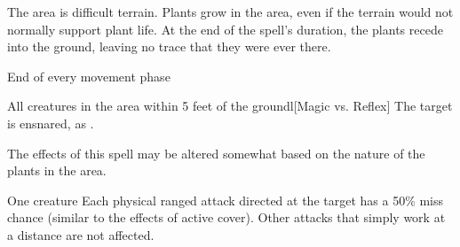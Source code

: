 \begin{spellheader}
    \spelldur{\durshort \dismissable}
\end{spellheader}
\begin{spelleffects}
    \spelleffect The area is difficult terrain. Plants grow in the area, even if the terrain would not normally support plant life. At the end of the spell's duration, the plants recede into the ground, leaving no trace that they were ever there.
    \begin{spelltrigger}{End of every movement phase}
        \begin{spelltarget}{All creatures in the area within 5 feet of the ground}l[Magic vs. Reflex]
            \spellsuccess The target is ensnared, as .
        \end{spelltarget}
    \end{spelltrigger}
\end{spelleffects}
\begin{spellfooter}
    \spellnotes The effects of this spell may be altered somewhat based on the nature of the plants in the area.
\end{spellfooter}

\begin{spellheader}
    \spelldur{\durshort \dismissable}
\end{spellheader}
\begin{spelleffects}
    \begin{spelltarget}{One creature}
        \spelleffect Each physical ranged attack directed at the target has a 50\% miss chance (similar to the effects of active cover). Other attacks that simply work at a distance are not affected.
    \end{spelltarget}
\end{spelleffects}
\begin{spellfooter}
    
\end{spellfooter}

